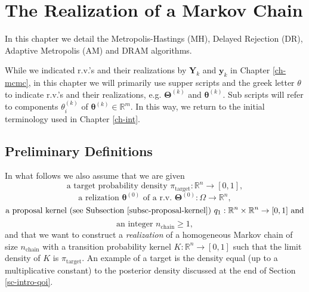 \chapter{The Realization of a Markov Chain}\label{ch-rmc}
\thispagestyle{headings}

In this chapter we detail the
Metropolis-Hastings (MH),
Delayed Rejection (DR),
Adaptive Metropolis (AM) and
DRAM algorithms.

While we indicated r.v.'s and their realizations by $\mathbf{Y}_k$ and $\mathbf{y}_k$ in Chapter \ref{ch-mcmc},
in this chapter we will primarily use supper scripts and the greek letter $\theta$ to indicate r.v.'s and their realizations, e.g. $\boldsymbol{\Theta}^{(k)}$ and $\boldsymbol{\theta}^{(k)}$.
Sub scripts will refer to components $\theta_i^{(k)}$ of $\boldsymbol{\theta}^{(k)}\in\mathbb{R}^m$.
In this way, we return to the initial terminology used in Chapter \ref{ch-int}.

\section{Preliminary Definitions}

In what follows we also assume that
we are given
\begin{equation}\label{eq-pi-target}
\text{a target probability density }\pi_{\text{target}}:\mathbb{R}^n\rightarrow [0,1],
\end{equation}
\begin{equation}\label{eq-y0}
\text{a relization }\boldsymbol{\theta}^{(0)}\text{ of a r.v. }\boldsymbol{\Theta}^{(0)}:\Omega\rightarrow\mathbb{R}^n,
\end{equation}
\begin{equation}\label{eq-q1}
\text{a proposal kernel (see Subsection \ref{subsc-proposal-kernel}) }q_1:\mathbb{R}^n\times \mathbb{R}^n\rightarrow [0,1]\text{ and}
\end{equation}
\begin{equation}\label{eq-n-chain}
\text{an integer }n_{\text{chain}}\geqslant 1,
\end{equation}
and that
we want to construct a {\it realization} of
a homogeneous Markov chain of size $n_{\text{chain}}$ with a transition probability kernel $K:\mathbb{R}^n\rightarrow [0,1]$
such that the limit density of $K$ is $\pi_{\text{target}}$.
An example of a target is the density equal (up to a multiplicative constant) to the posterior density discussed
at the end of Section \ref{sc-intro-qoi}.

